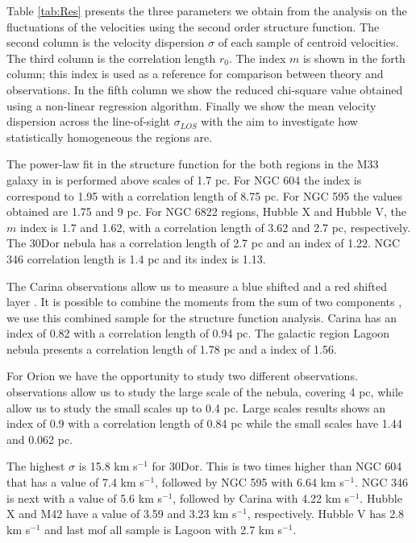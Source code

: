 \documentclass[fleqn,usenatbib, useAMS, a4paper]{mnras}
\newcommand\halpha{H${\alpha}$}
\begin{document}
Table \ref{tab:Res} presents the three parameters we obtain from the analysis on the fluctuations of the velocities using the second order structure function.
The second column is the velocity dispersion \(\sigma\) of each sample of centroid velocities.
The third column is the correlation length \(r_0\).
The index \(m\) is shown in the forth column;
this index is used as a reference for comparison between theory and observations.
In the fifth column we show the reduced chi-square value obtained using a non-linear regression algorithm. 
Finally we show the mean velocity dispersion across the line-of-sight \(\sigma_{LOS}\) with the aim to investigate how statistically homogeneous the regions are.


The power-law fit in the structure function for the both regions in the M33 galaxy in is performed above scales of 1.7 pc.
For NGC 604 the index is correspond to 1.95 with a correlation length of 8.75 pc. For NGC 595 the values obtained are 1.75 and 9 pc.
For NGC 6822 regions, Hubble X and Hubble V, the $m$ index is 1.7 and 1.62, with a correlation length of 3.62 and 2.7 pc, respectively.
The 30Dor nebula \citep{Castro:2018a} has a correlation length of 2.7 pc and an index of 1.22.
NGC 346 correlation length is 1.4 pc and its index is 1.13.

The Carina observations allow us to measure a blue shifted and a red shifted layer \citet{Damiani:2016a}. It is possible to combine the moments from the sum of two components \citep{2008RMxAA..44..181G}, we use this combined sample for the structure function analysis.
Carina has an index of 0.82 with a correlation length of 0.94 pc.
The galactic region Lagoon nebula \citep{Damiani:2017b} presents a correlation length of 1.78 pc and a index of 1.56.

For Orion we have the opportunity to study two different observations. \citet{1987A&A...176..347H} observations allow us to study the large scale of the nebula, covering 4 pc, while \cite{arthur2016turbulence} allow us to study the small scales up to 0.4 pc. Large scales results shows an index of 0.9 with a correlation length of 0.84 pc while the small scales have 1.44 and 0.062 pc.
  


The highest \(\sigma\) is 15.8 km s\(^{-1}\) for 30Dor.
This is two times higher than NGC 604 that has a value of 7.4 km s\(^{-1}\), followed by NGC 595 with 6.64 km s\(^{-1}\).
NGC 346 is next with a value of 5.6 km s\(^{-1}\), followed by Carina with 4.22 km s\(^{-1}\).
Hubble X and M42 have a value of 3.59 and 3.23 km s\(^{-1}\), respectively.
Hubble V has 2.8 km s\(^{-1}\) and last mof all sample is Lagoon with 2.7 km s\(^{-1}\).
\end{document}
